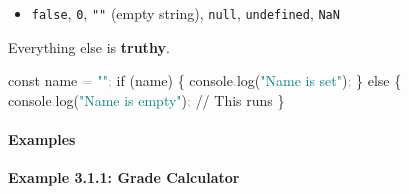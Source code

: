 \documentclass[
  justified,
  openright,
]{tufte-book}
\let\subsubsection\paragraph
\let\paragraph\paragraph
\newcommand{\BuiltInTok}[1]{#1}
\newcommand{\CommentTok}[1]{\textcolor{MidGray}{#1}}
\newcommand{\ControlFlowTok}[1]{\textcolor{BrandBlue}{#1}}
\newcommand{\FunctionTok}[1]{\textcolor{BrandBlue}{#1}}
\newcommand{\KeywordTok}[1]{\textcolor{BrandBlue}{#1}}
\newcommand{\NormalTok}[1]{#1}
\newcommand{\OperatorTok}[1]{\textcolor{DarkGray}{#1}}
\newcommand{\StringTok}[1]{\textcolor{Teal}{#1}}
\newenvironment{Shaded}{%
  \begin{snugshade}
}{%
  \end{snugshade}
}
\let\subsubsection\paragraph
\let\paragraph\paragraph
\providecommand{\tightlist}{%
  \setlength{\itemsep}{0pt}\setlength{\parskip}{0pt}}
\begin{document}
\begin{itemize}
\tightlist
\item
  \texttt{false}, \texttt{0}, \texttt{""} (empty string), \texttt{null},
  \texttt{undefined}, \texttt{NaN}
\end{itemize}

Everything else is \textbf{truthy}.

\begin{Shaded}
\begin{Highlighting}[]
\KeywordTok{const}\NormalTok{ name }\OperatorTok{=} \StringTok{""}\OperatorTok{;}
\ControlFlowTok{if}\NormalTok{ (name) \{}
  \BuiltInTok{console}\OperatorTok{.}\FunctionTok{log}\NormalTok{(}\StringTok{"Name is set"}\NormalTok{)}\OperatorTok{;}
\NormalTok{\} }\ControlFlowTok{else}\NormalTok{ \{}
  \BuiltInTok{console}\OperatorTok{.}\FunctionTok{log}\NormalTok{(}\StringTok{"Name is empty"}\NormalTok{)}\OperatorTok{;} \CommentTok{// This runs}
\NormalTok{\}}
\end{Highlighting}
\end{Shaded}

\subsubsection{Examples}\label{examples-2}

\textbf{Example 3.1.1: Grade Calculator}
\end{document}
